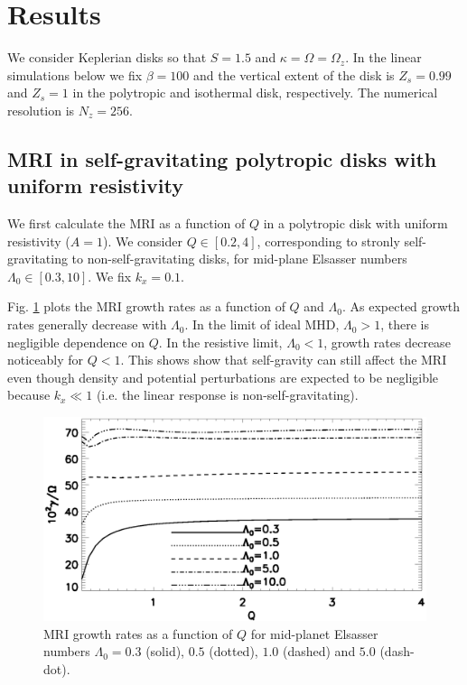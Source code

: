 \section{Results}
We consider Keplerian disks so that $S = 1.5$ and $\kappa = \Omega =
\Omega_z.$ In the linear simulations below we fix $\beta=100$ and the
vertical extent of the disk is $Z_s=0.99$ and $Z_s=1$ in the
polytropic and isothermal disk, respectively. The numerical resolution
is $N_z=256$.  


\subsection{MRI in self-gravitating polytropic disks with uniform
  resistivity}  
We first calculate the MRI as a function of $Q$ in a polytropic disk
with uniform resistivity ($A=1$). We consider $Q\in[0.2,4]$,
corresponding to stronly self-gravitating to non-self-gravitating
disks, for mid-plane Elsasser numbers $\Lambda_0\in[0.3,10]$. We fix
$k_x=0.1$.  

Fig. \ref{compare_growth_poly_uniresis} plots the MRI growth rates as
a function of $Q$ and $\Lambda_0$. As expected growth rates generally
decrease with $\Lambda_0$. In the limit of ideal MHD, $\Lambda_0>1$,
there is negligible dependence on $Q$. In the resistive limit,
$\Lambda_0<1$, growth rates decrease noticeably for $Q<1$. This shows
show that self-gravity can still affect the MRI even  
though density and potential perturbations are expected to be
negligible because $k_x\ll1$ (i.e. the linear response is
non-self-gravitating).    
 
\begin{figure}
  \includegraphics[width=\linewidth]{figures/compare_growth_poly_uniresis}
  \caption{MRI growth rates as a function of $Q$ for mid-planet
    Elsasser numbers $\Lambda_0=0.3$ (solid), $0.5$ (dotted), $1.0$
    (dashed) and $5.0$ (dash-dot).  
    \label{compare_growth_poly_uniresis}}
\end{figure}

